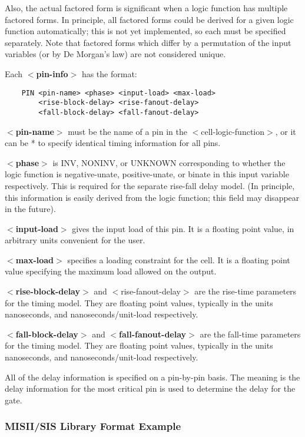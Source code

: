 {\begin{pespace}
Also, the actual factored form is significant when a logic function has
multiple factored forms.  In principle, all factored forms could be
derived for a given logic function automatically; this is not yet
implemented, so each must be specified separately.  Note that factored
forms which differ by a permutation of the input variables (or by De
Morgan's law) are not considered unique.

Each {\bf $<$pin-info$>$} has the format:

\begin{verbatim}
	PIN <pin-name> <phase> <input-load> <max-load>
	    <rise-block-delay> <rise-fanout-delay>
	    <fall-block-delay> <fall-fanout-delay>
\end{verbatim}

{\bf $<$pin-name$>$}
 must be the name of a pin in the $<$cell-logic-function$>$,
or it can be * to specify identical timing information for all pins. 

{\bf $<$phase$>$} is INV, NONINV, or UNKNOWN corresponding to whether the
logic function is negative-unate, positive-unate, or binate in
this input variable respectively.  This is required for the separate
rise-fall delay model.  (In principle, this information is easily
derived from the logic function; this field may disappear in the future).

{\bf $<$input-load$>$ }
gives the input load of this pin.  It is a floating point
value, in arbitrary units convenient for the user.

{\bf $<$max-load$>$ }specifies a loading constraint for the cell.  It is a
floating point value specifying the maximum load allowed on the output.

{\bf $<$rise-block-delay$>$ }
and $<$rise-fanout-delay$>$ are the rise-time parameters
for the timing model.  They are floating point values, typically in 
the units nanoseconds, and nanoseconds/unit-load respectively.

{\bf $<$fall-block-delay$>$ } and {\bf $<$fall-fanout-delay$>$}
 are the fall-time parameters
for the timing model.  They are floating point values, typically in 
the units nanoseconds, and nanoseconds/unit-load respectively.

All of the delay information is specified on a pin-by-pin basis.  The
meaning is the delay information for the most critical pin is used
to determine the delay for the gate.


\subsubsection{   MISII/SIS Library Format Example}



\end{pespace}}
